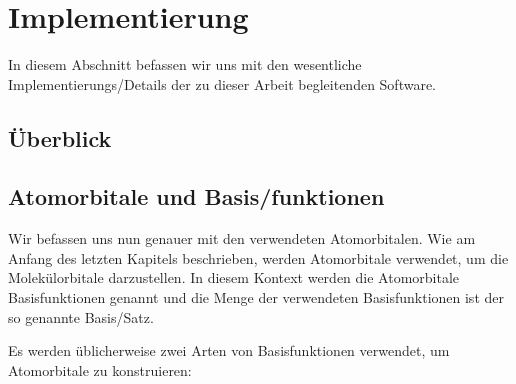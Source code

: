 \section{Implementierung}
In diesem Abschnitt befassen wir uns mit den wesentliche Implementierungs\-/Details
der zu dieser Arbeit begleitenden Software.

\subsection{Überblick}

\subsection{Atomorbitale und Basis\-/funktionen}\label{basis-functions-section}
Wir befassen uns nun genauer mit den verwendeten Atomorbitalen.
Wie am Anfang des letzten Kapitels beschrieben, werden Atomorbitale verwendet,
um die Molekülorbitale darzustellen. In diesem Kontext werden die Atomorbitale
Basisfunktionen genannt und die Menge der verwendeten Basisfunktionen
ist der so genannte Basis\-/Satz.

Es werden üblicherweise zwei Arten von Basisfunktionen verwendet,
um Atomorbitale zu konstruieren:

